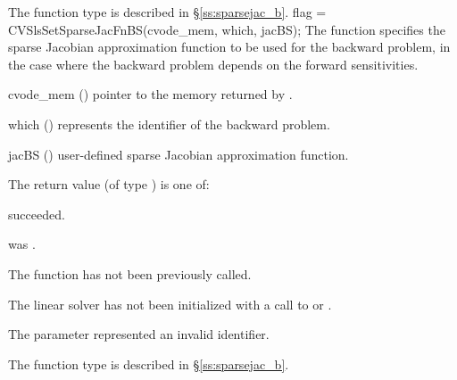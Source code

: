 {
  The function type  is described in \S\ref{ss:sparsejac_b}.
}
{
  flag = CVSlsSetSparseJacFnBS(cvode\_mem, which, jacBS);
}
{
  The function  specifies the sparse Jacobian
  approximation function to be used for the backward problem, in the
  case where the backward problem depends on the forward sensitivities.
}
{
  \begin{args}
  \item[cvode\_mem] ()
    pointer to the {\cvodes} memory returned by .
  \item[which] ()
    represents the identifier of the backward problem.
  \item[jacBS] ()
    user-defined sparse Jacobian approximation function.
  \end{args}
}
{
  The return value  (of type ) is one of:
  \begin{args}
  \item[\Id{CVSLS\_SUCCESS}] 
     succeeded.
  \item[\Id{CVSLS\_MEM\_NULL}]
     was .
  \item[\Id{CVSLS\_NO\_ADJ}]
    The function  has not been previously called.
  \item[\Id{CVSLS\_LMEM\_NULL}]
    The linear solver has not been initialized with a call to 
    or .
  \item[\Id{CVSLS\_ILL\_INPUT}]
    The parameter  represented an invalid identifier.
  \end{args}
}
{
  The function type  is described in \S\ref{ss:sparsejac_b}.
}


